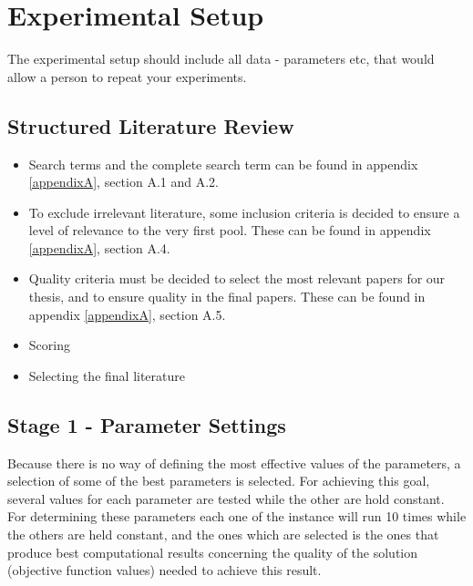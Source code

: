\section{Experimental Setup}

The experimental setup should include all data - parameters etc, that would allow a person to repeat your experiments. 
 
\subsection{Structured Literature Review}

\begin{itemize}
\item Search terms and the complete search term can be found in appendix \ref{appendixA}, section A.1 and A.2.
\item To exclude irrelevant literature, some inclusion criteria is decided to ensure a level of relevance to the very first pool. These can be found in appendix \ref{appendixA}, section A.4.
\item Quality criteria must be decided to select the most relevant papers for our thesis, and to ensure quality in the final papers. These can be found in appendix \ref{appendixA}, section A.5.
\item Scoring
\item Selecting the final literature
\end{itemize}

\subsection{Stage 1 - Parameter Settings}

Because there is no way of defining the most effective values of the parameters, a selection of some of the best parameters is selected. For achieving this goal, several values for each parameter are tested while the other are hold constant. For determining these parameters each one of the instance will run 10 times while the others are held constant, and the ones which are selected is the ones that produce best computational results concerning the quality of the solution (objective function values) needed to achieve this result. 


